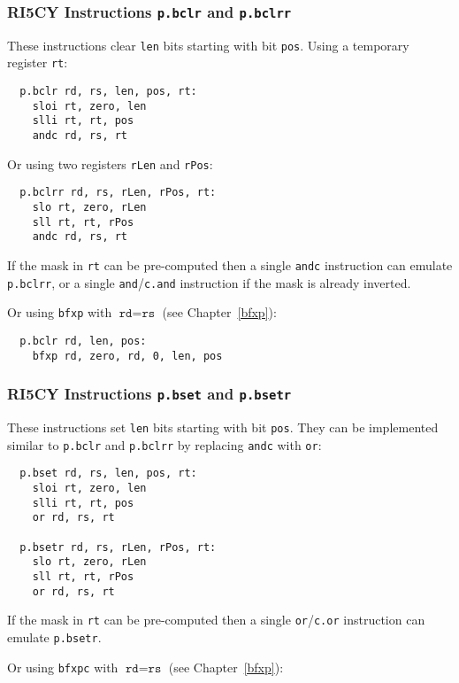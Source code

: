 \subsubsection{RI5CY Instructions {\tt p.bclr} and {\tt p.bclrr}}

These instructions clear {\tt len} bits starting with bit {\tt pos}. Using a
temporary register {\tt rt}:

\begin{verbatim}
  p.bclr rd, rs, len, pos, rt:
    sloi rt, zero, len
    slli rt, rt, pos
    andc rd, rs, rt
\end{verbatim}

Or using two registers {\tt rLen} and {\tt rPos}:

\begin{verbatim}
  p.bclrr rd, rs, rLen, rPos, rt:
    slo rt, zero, rLen
    sll rt, rt, rPos
    andc rd, rs, rt
\end{verbatim}

If the mask in {\tt rt} can be pre-computed then a single {\tt andc} instruction
can emulate {\tt p.bclrr}, or a single {\tt and}/{\tt c.and} instruction if the
mask is already inverted.

Or using {\tt bfxp} with $\texttt{rd} = \texttt{rs}$ (see Chapter~\ref{bfxp}):

\begin{verbatim}
  p.bclr rd, len, pos:
    bfxp rd, zero, rd, 0, len, pos
\end{verbatim}

\subsubsection{RI5CY Instructions {\tt p.bset} and {\tt p.bsetr}}

These instructions set {\tt len} bits starting with bit {\tt pos}. They can be
implemented similar to {\tt p.bclr} and {\tt p.bclrr} by replacing {\tt andc}
with {\tt or}:

\begin{verbatim}
  p.bset rd, rs, len, pos, rt:
    sloi rt, zero, len
    slli rt, rt, pos
    or rd, rs, rt

  p.bsetr rd, rs, rLen, rPos, rt:
    slo rt, zero, rLen
    sll rt, rt, rPos
    or rd, rs, rt
\end{verbatim}

If the mask in {\tt rt} can be pre-computed then a single {\tt or}/{\tt c.or} instruction
can emulate {\tt p.bsetr}.

Or using {\tt bfxpc} with $\texttt{rd} = \texttt{rs}$ (see Chapter~\ref{bfxp}):

